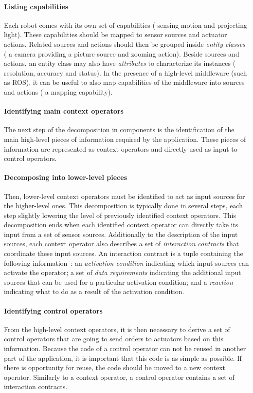 \paragraph{Listing capabilities}
Each robot comes with its own set of capabilities (\eg{} sensing
motion and projecting light). These capabilities should be mapped to
sensor sources and actuator actions. Related sources and actions
should then be grouped inside \emph{entity classes} (\eg{} a camera
providing a picture source and zooming action). Beside sources and
actions, an entity class may also have \emph{attributes} to
characterize its instances (\eg{} resolution, accuracy and status). In
the presence of a high-level middleware (such as ROS), it can be
useful to also map capabilities of the middleware into sources and
actions (\eg{} a mapping capability).

\paragraph{Identifying main context operators}
The next step of the decomposition in components is the identification
of the main high-level pieces of information required by the
application. These pieces of information are represented as context
operators and directly used as input to control operators.

\paragraph{Decomposing into lower-level pieces}
Then, lower-level context operators must be identified to act as input
sources for the higher-level ones. This decomposition is typically
done in several steps, each step slightly lowering the level of
previously identified context operators. This decomposition ends when
each identified context operator can directly take its input from a
set of sensor sources. Additionally to the description of the input
sources, each context operator also describes a set of
\emph{interaction contracts} that coordinate these input sources. An
interaction contract is a tuple containing the following
information~\cite{Cass11a}: an \emph{activation condition} indicating
which input sources can activate the operator; a set of \emph{data
  requirements} indicating the additional input sources that can be
used for a particular activation condition; and a \emph{reaction}
indicating what to do as a result of the activation condition.

\paragraph{Identifying control operators}
From the high-level context operators, it is then necessary to derive
a set of control operators that are going to send orders to actuators
based on this information. Because the code of a control operator can
not be reused in another part of the application, it is important that
this code is as simple as possible. If there is opportunity for reuse,
the code should be moved to a new context operator. Similarly to a
context operator, a control operator contains a set of interaction
contracts.

